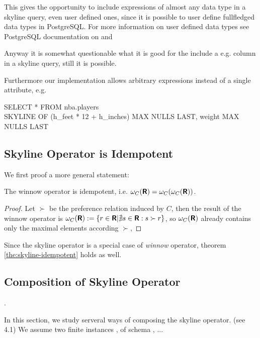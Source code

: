 This gives the opportunity to include expressions of almost any data type in a skyline query, even user defined ones, since it is possible to user define fullfledged data types in PostgreSQL. For more information on user defined data types see PostgreSQL documentation on  and 

Anyway it is somewhat questionable what it is good for the include a e.g.  column in a skyline query, still it is possible.

Furthermore our implementation allows arbitrary expressions instead of a single attribute, e.g.

\begin{sql}
SELECT * FROM nba.players \\
SKYLINE OF (h\_feet * 12 + h\_inches) MAX NULLS LAST, weight MAX NULLS LAST
\end{sql}

\subsection{Skyline Operator is Idempotent}
We first proof a more general statement:
\begin{theorem}\label{the:skyline-idempotent}
The winnow operator is idempotent, i.e. $\omega_C(\textnormal{\bf\textsf{R}})=\omega_C(\omega_C(\textnormal{\bf\textsf{R}}))$.
\end{theorem}
\begin{proof}
Let $\succ$ be the preference relation induced by $C$, then the result of the winnow operator is $\omega_C(\textnormal{\bf\textsf{R}}) := \{r \in \textnormal{\bf\textsf{R}} | \nexists s \in \textnormal{\bf\textsf{R}} : s \succ r \}$, so $\omega_C(\textnormal{\bf\textsf{R}})$ already contains only the maximal elements according $\succ$, 
\end{proof}
Since the skyline operator is a special case of \emph{winnow} operator, theorem \ref{the:skyline-idempotent} holds as well.

\subsection{Composition of Skyline Operator}
 .


In this section, we study serveral ways of composing the skyline operator. (see \citep{Chomicki2002} 4.1)
We assume two finite instances ,  of schema , ...


